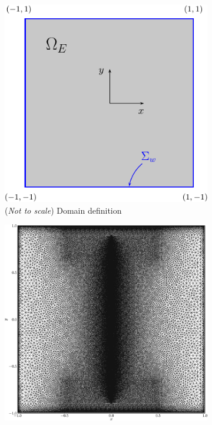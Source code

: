 	\begin{figure}[!b]
     \centering
     \begin{subfigure}[t]{0.45\textwidth}
             \includegraphics[width=\textwidth]{figures/eulerian/clercxBruneauDomainDefinition-crop.pdf}
             \caption{(\textit{Not to scale}) Domain definition}
             \label{fig:clercxBruneauDomainDefinition}
     \end{subfigure}%
     \qquad %
     \begin{subfigure}[t]{0.45\textwidth}
             \includegraphics[width=\textwidth]{figures/eulerian/clercxBruneauDomainMesh-crop.png}

\end{subfigure}
\end{figure}
